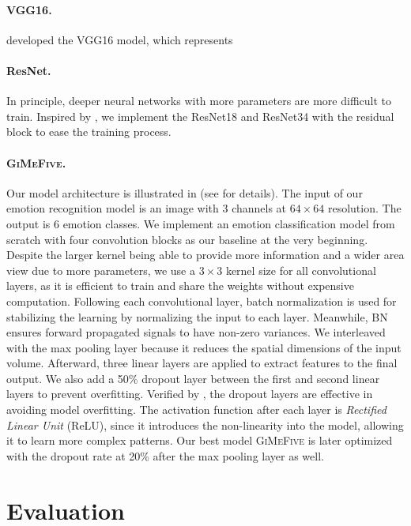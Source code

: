 \paragraph{VGG16.}
\citet{SimonyanZ14a} developed the VGG16 model, 
which represents

\paragraph{ResNet.}
In principle, 
deeper neural networks with more parameters are more difficult to train. 
Inspired by \citet{HeZRS16}, 
we implement the ResNet18 and ResNet34 with the residual block to ease the training process. 

\paragraph{\textsc{GiMeFive}.}
Our model architecture is illustrated in  (see  for details). 
The input of our emotion recognition model is an image with 3 channels at $64 \times 64 $ resolution. 
The output is 6 emotion classes. %
We implement an emotion classification model from scratch with four convolution blocks as our baseline at the very beginning. 
Despite the larger kernel being able to provide more information and a wider area view due to more parameters, 
we use a $3 \times 3$ kernel size for all convolutional layers, 
as it is efficient to train and share the weights without expensive computation. 
Following each convolutional layer, 
batch normalization is used for stabilizing the learning by normalizing the input to each layer. 
Meanwhile, 
BN ensures forward propagated signals to have non-zero variances. 
We interleaved with the max pooling layer because it reduces the spatial dimensions of the input volume. 
Afterward, three linear layers are applied to extract features to the final output. 
We also add a 50\% dropout layer between the first and second linear layers to prevent overfitting. 
Verified by \citet{BarsoumZCZ16}, 
the dropout layers are effective in avoiding model overfitting. 
The activation function after each layer is \textit{Rectified Linear Unit} (ReLU), 
since it introduces the non-linearity into the model, 
allowing it to learn more complex patterns. 
Our best model \textsc{GiMeFive} is later optimized with the dropout rate at 20\% after the max pooling layer as well.

\section{Evaluation}
\label{sec:evaluation}

